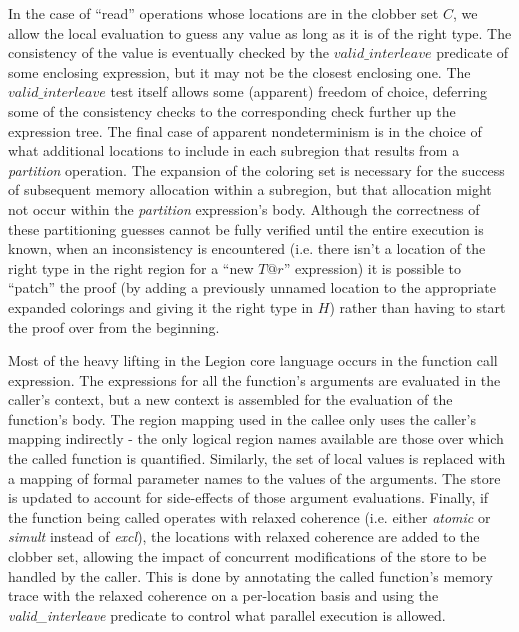 In the case of ``read'' operations whose locations are in the clobber set $C$, we allow the local
evaluation to guess any value as long as it is of the right type.  The consistency of the value
is eventually checked by the $valid\_interleave$ predicate of some enclosing expression, but it
may not be the closest enclosing one.  The $valid\_interleave$ test itself allows some (apparent)
freedom of choice, deferring some of the consistency checks to the corresponding check further up
the expression tree.  The final case of apparent nondeterminism is in the choice of what 
additional locations to include in each subregion that results from a {\em partition} operation.
The expansion of the coloring set is necessary for the success of subsequent memory allocation
within a subregion, but that allocation might not occur within the {\em partition} expression's
body.  Although the correctness of these partitioning guesses cannot be fully verified until the
entire execution is known, when an inconsistency is encountered (i.e. there isn't a location of
the right type in the right region for a ``new $T@r$'' expression) it is possible to ``patch'' the 
proof (by adding a previously unnamed location to the appropriate expanded colorings and giving
it the right type in $H$) rather than having to start the proof over from the beginning.

Most of the heavy lifting in the Legion core language occurs in the function call expression.
The expressions for all the function's arguments are evaluated in the caller's context, but a
new context is assembled for the evaluation of the function's body.  The region mapping used
in the callee only uses the caller's mapping indirectly - the only logical region names available
are those over which the called function is quantified.  Similarly, the set of local values is
replaced with a mapping of formal parameter names to the values of the arguments.  The store
is updated to account for side-effects of those argument evaluations.  Finally, if the function
being called operates with relaxed coherence (i.e. either {\em atomic} or {\em simult} instead of
{\em excl}), the locations with relaxed coherence are added to the clobber set, allowing the
impact of concurrent modifications of the store to be handled by the caller.  This is done by
annotating the called function's memory trace with the relaxed coherence on a per-location basis
and using the {\em valid\_interleave} predicate to control what parallel execution is allowed.

